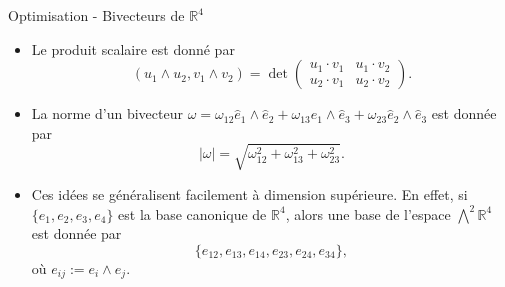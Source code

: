 \documentclass[10pt, envcountsect]{beamer}
\theoremstyle{plain}
\newcommand{\R}{\mathbb{R}}
\begin{document}
\begin{frame}{Optimisation - Bivecteurs de $\R^4$}
\begin{itemize}
\item Le produit scalaire est donné par
\begin{equation}
( u_1 \wedge u_2 , v_1 \wedge v_2 ) = \det \left (\begin{array}{cc}
u_1 \cdot v_1 & u_1 \cdot v_2 \\ 
u_2 \cdot v_1 & u_2 \cdot v_2
\end{array}  \right).
\end{equation}

\item La norme d'un bivecteur $\omega = \omega_{12} \hat{e}_1 \wedge \hat{e}_2 + \omega_{13} \hat{e}_1 \wedge \hat{e}_3 + \omega_{23} \hat{e}_2 \wedge \hat{e}_3$ est donnée par
\begin{equation}
|\omega| = \sqrt{\omega_{12}^2 + \omega_{13}^2 + \omega_{23}^2}.
\end{equation}

\item Ces idées se généralisent facilement à dimension supérieure. En effet, si $\{e_1, e_2, e_3, e_4\}$ est la base canonique de $\R^4$, alors une base de l'espace $\bigwedge^2 \R^4$ est donnée par
\begin{equation}
\{e_{12}, e_{13}, e_{14}, e_{23}, e_{24}, e_{34}\},
\end{equation}
où  $e_{ij} := e_i \wedge e_j$.
\end{itemize}
\end{frame}
\end{document}
